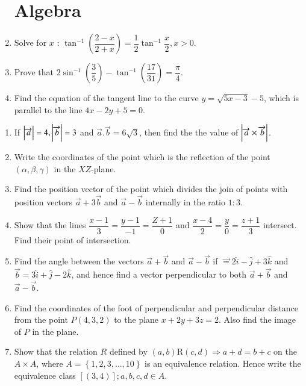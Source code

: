 \documentclass[12pt,-letter paper]{article}
\providecommand{\brak}[1]{\ensuremath{\left(#1\right)}}
\providecommand{\cbrak}[1]{\ensuremath{\left\{#1\right\}}}
\providecommand{\sbrak}[1]{\ensuremath{\left[#1\right]}}
\begin{document}
\begin{enumerate}
\section*{Algebra}
\item Solve for $x$ : $ \tan^{-1}\brak{\dfrac{2-x}{2+x}} = \dfrac{1}{2}\tan^{-1}\dfrac{x}{2}, x>0$.
\item Prove that $2\sin^{-1}\brak{\dfrac{3}{5}} - \tan^{-1}\brak{\dfrac{17}{31}} = \dfrac{\pi}{4}$.
\item Find the equation of the tangent line to the curve $y = \sqrt{5x - 3} - 5$, which is parallel to the line $4x - 2y + 5 = 0$.
\end{enumerate}

\begin{enumerate}
\section*{Vector Algebra}
\item If $\abs{\overrightarrow{a}} = 4, \abs{\overrightarrow{b}} = 3$ and $ \overrightarrow{a}.\overrightarrow{b} = 6\sqrt{3}$, then find the the value of $\abs{\overrightarrow{a}\times \overrightarrow{b}}$.
\item Write the coordinates of the point which is the reflection of the point $\brak{\alpha,\beta,\gamma}$ in the $XZ$-plane.
\item Find the position vector of the point which divides the join of points with position vectors $\overrightarrow{a} + 3\overrightarrow{b}$ and $\overrightarrow{a} - \overrightarrow{b}$ internally in the ratio $1:3$.
\item Show that the lines $\dfrac{x-1}{3} = \dfrac{y-1}{-1} = \dfrac{Z+1}{0}$ and $ \dfrac{x-4}{2} = \dfrac{y}{0} = \dfrac{z+1}{3}$ intersect. Find their point of intersection.
\item Find the angle between the vectors $ \overrightarrow{a} + \overrightarrow{b} $ and $ \overrightarrow{a} - \overrightarrow{b} $ if $ \overrightarrow = 2\hat{i} - \hat{j} +3\hat{k} $ and $ \overrightarrow{b} = 3\hat{i} + \hat{j} - 2\hat{k}$, and hence find a vector perpendicular to both $ \overrightarrow{a} + \overrightarrow{b} $ and $\overrightarrow{a} - \overrightarrow{b}$.
\item Find the coordinates of the foot of perpendicular and perpendicular distance from the point $P\brak{4,3,2}$ to the plane $x + 2y + 3z = 2$. Also find the image of $P$ in the plane.
\item Show that the relation $R$ defined by $\brak{a,b}$R$\brak{c,d} \Rightarrow a + d = b + c$ on the $A\times A$, where $A = \cbrak{1,2,3,\ldots,10}$ is an equivalence relation. Hence write the equivalence class $\sbrak{\brak{3,4}}; a,b,c,d \in A$.
\end{enumerate}
\end{document}

